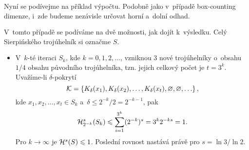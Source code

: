 Nyní se podívejme na příklad výpočtu. Podobně jako v~případě box-counting dimenze, i~zde budeme nezávisle určovat horní a~dolní odhad.
\begin{example}\label{ex:sierpinskeho-trojuhelnik-hd-dimenze}
    V~tomto případě se podíváme na dvě možnosti, jak dojít k~výsledku. Celý Sierpińského trojúhelník si označme $S$.
    \begin{itemize}
        \item V~$k$-té iteraci $S_k$, kde $k=0,1,2,\ldots$, vzniknou 3 nové trojúhelníky o~obsahu $1/4$ obsahu původního trojúhelníka, tzn. jejich celkový počet je $t=3^k$. Uvažíme-li $\delta$-pokrytí
        \[\mathcal{K}=\set{K_\delta(x_1),K_\delta(x_2),\ldots,K_\delta(x_t),\emptyset,\emptyset,\ldots},\]
        kde $x_1,x_2,\ldots,x_t\in S_k$ a~$\delta\leqslant 2^{-k}/2=2^{-k-1}$, pak
        \[\hausdorffdeltameasure{s}{2^{-k}}(S_k)\leqslant\sum_{i=1}^{3^k}(2^{-k})^s=3^k2^{-ks}=1.\]
        Pro $k\to\infty$ je $\hausdorffmeasure{s}(S)\leqslant 1$. Poslední rovnost nastává právě pro $s=\ln{3}/\ln{2}$.


\end{itemize}
\end{example}
